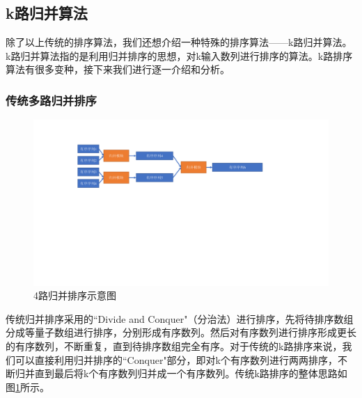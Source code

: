 \subsection{k路归并算法}
除了以上传统的排序算法，我们还想介绍一种特殊的排序算法——k路归并算法。k路归并算法指的是利用归并排序的思想，对k输入数列进行排序的算法。k路排序算法有很多变种，接下来我们进行逐一介绍和分析。
\subsubsection{传统多路归并排序}
\begin{figure}[htbp]
    \centering
    \includegraphics[width=\linewidth]{figures/traditional k way sort.pdf}
    \caption{4路归并排序示意图}
    \label{fig:traditional_k_way_sort}
\end{figure}
传统归并排序采用的``Divide and Conquer"（分治法）进行排序，先将待排序数组分成等量子数组进行排序，分别形成有序数列。然后对有序数列进行排序形成更长的有序数列，不断重复，直到待排序数组完全有序。对于传统的k路排序来说，我们可以直接利用归并排序的``Conquer"部分，即对k个有序数列进行两两排序，不断归并直到最后将k个有序数列归并成一个有序数列。传统k路排序的整体思路如图\ref{fig:traditional_k_way_sort}所示。

